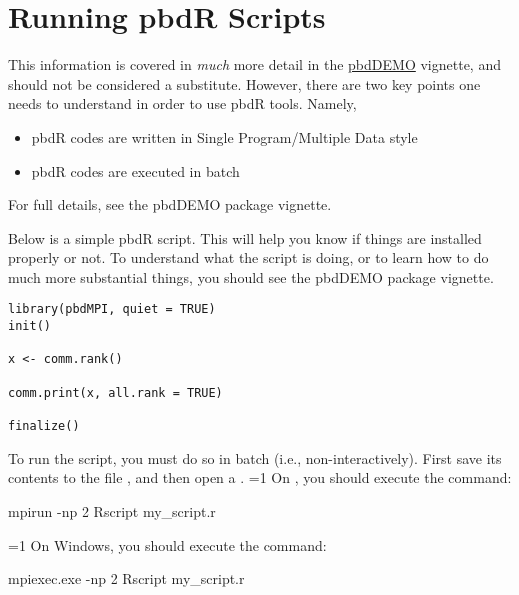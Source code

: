 \section{Running pbdR Scripts}
This information is covered in \emph{much} more detail in the 
\href{http://cran.r-project.org/web/packages/pbdDEMO/index.html}{pbdDEMO} 
vignette, and should not be considered a substitute.  However, there are two key points one needs to understand in order to use pbdR tools.  Namely,
\begin{itemize}
  \item pbdR codes are written in Single Program/Multiple Data style
  \item pbdR codes are executed in batch
\end{itemize}
For full details, see the pbdDEMO package vignette.

Below is a simple pbdR script.  This will help you know if things are installed properly or not.  To understand what the script is doing, or to learn how to do much more substantial things, you should see the pbdDEMO package vignette.
\begin{lstlisting}[language=rr]
library(pbdMPI, quiet = TRUE)
init()

x <- comm.rank()

comm.print(x, all.rank = TRUE)

finalize()
\end{lstlisting}

To run the script, you must do so in batch (i.e., non-interactively).  First save its contents to the file , and then open a \incall{/}.
%
\ifnum\value{mac_or_lin}=1
On \maclin, you should execute the command:
\begin{Code}
mpirun -np 2 Rscript my_script.r
\end{Code}%
\fi
%
\ifnum\value{include_windows}=1
On Windows, you should execute the command:
\begin{Code}
mpiexec.exe -np 2 Rscript my_script.r
\end{Code}%
\fi


